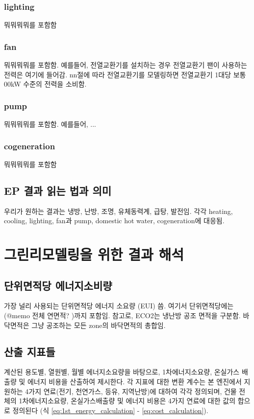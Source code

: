\subsubsection{lighting}
뭐뭐뭐뭐를 포함함

\subsubsection{fan}
뭐뭐뭐뭐를 포함함.
예를들어, 전열교환기를 설치하는 경우 전열교환기 팬이 사용하는 전력은 여기에 들어감.
nn절에 따라 전열교환기를 모델링하면 전열교환기 1대당 보통 00kW 수준의 전력을 소비함.

\subsubsection{pump}
뭐뭐뭐뭐를 포함함. 예를들어, ...

\subsubsection{cogeneration}
뭐뭐뭐뭐를 포함함

\subsection{EP 결과 읽는 법과 의미}
우리가 원하는 결과는 냉방, 난방, 조명, 유체동력계, 급탕, 발전임.
각각 heating, cooling, lighting, fan과 pump, domestic hot water, cogeneration에 대응됨.


\section{그린리모델링을 위한 결과 해석}

\subsection{단위면적당 에너지소비량} \label{subsec:floorarea_definition_for_EUI}
가장 널리 사용되는 단위면적당 에너지 소요량 (EUI) 씀. 여기서 단위면적당에는 (@memo 전체 연면적? )까지 포함임. 참고로, ECO2는 냉난방 공조 면적을 구분함. 바닥면적은 그냥 공조하는 모든 zone의 바닥면적의 총합임.

\subsection{산출 지표들} \label{subsec:result_converting_coeff_definition}
\simulator\은 계산된 용도별, 열원별, 월별 에너지소요량을 바탕으로, 1차에너지소요량, 온실가스 배출량 및 에너지 비용을 산출하여 제시한다. 각 지표에 대한 변환 계수는 본 엔진에서 지원하는 4가지 연료(전기, 천연가스, 등유, 지역난방)에 대하여 각각 정의되며, 건물 전체의 1차에너지소요량, 온실가스배출량 및 에너지 비용은 4가지 연료에 대한 값의 합으로 정의된다 (식 \ref{eq:1st_energy_calculation} - \ref{eq:cost_calculation}).

